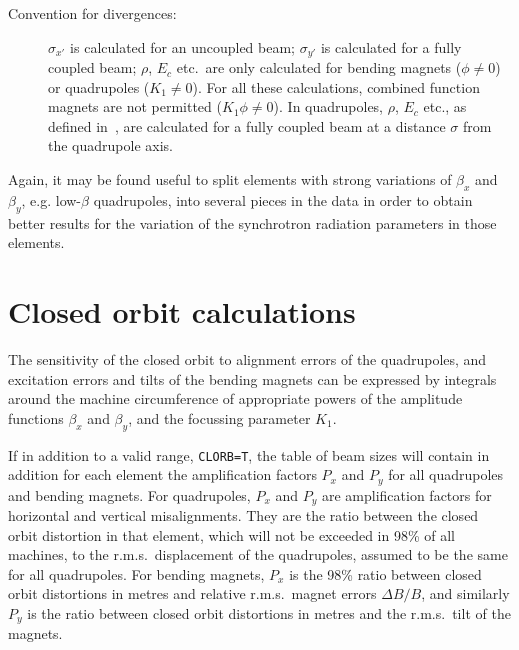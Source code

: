 \begin{description}
 
\item[Convention for divergences:] \(\sigma_{x'}\) is calculated for an
uncoupled beam; \(\sigma_{y'}\) is calculated for a fully coupled beam;
\(\rho\), \(E_c\) etc.\ are only calculated for bending magnets
(\(\phi\neq0\)) or quadrupoles (\(K_1 \neq 0 \)). For all these calculations,
 combined function magnets
are not permitted (\(K_1\phi \neq 0\)). In quadrupoles, \(\rho\), \(E_c\)
etc., as defined in~\cite{B-KEIL}, are calculated for a fully coupled beam
at a distance \(\sigma\) from the quadrupole axis.
 
\end{description}
 
Again, it may be found useful to split elements with strong
variations of \(\beta_x\) and \(\beta_y\), e.g. low-\(\beta\) quadrupoles,
into several pieces in the data in order to obtain better results
for the variation of the synchrotron radiation parameters in
those elements.
 
\section{Closed orbit calculations}
The sensitivity of the closed orbit to alignment errors of the
quadrupoles, and excitation errors and tilts of the bending magnets
can be expressed by integrals around the machine circumference of
appropriate powers of the amplitude functions \(\beta_x\) and \(\beta_y\),
and the focussing parameter \(K_1\).
 
If in addition to a valid range, {\tt CLORB=T},
the table of beam sizes will contain in addition for each element the
amplification factors \(P_x\) and \(P_y\) for all quadrupoles and
bending magnets. For quadrupoles, \(P_x\) and \(P_y\) are amplification
factors for horizontal and vertical misalignments. They are the ratio
between the closed orbit distortion in that element, which will not be
exceeded in 98\% of all machines, to the r.m.s.\ displacement of the
quadrupoles, assumed to be the same for all quadrupoles. For bending
magnets, \(P_x\) is the 98\% ratio between closed orbit distortions in
metres and relative r.m.s.\ magnet errors \(\Delta B/B\), and similarly
\(P_y\) is the ratio between closed orbit distortions in metres and the
r.m.s.\ tilt of the magnets.

